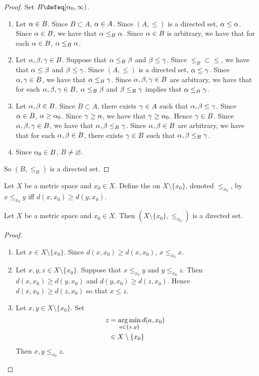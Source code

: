 \documentclass{book}
\begin{document}
	\begin{proof} Set $B \defeq [\al_0, \infty)$.
		\begin{enumerate}
			\item Let $\alpha \in B$. Since $B \subset A$, $\alpha \in A$. Since $(A, \leq)$ is a directed set, $\alpha \leq \alpha$. Since $\alpha \in B$, we have that $\alpha \leq_B \alpha$. Since $\alpha \in B$ is arbitrary, we have that for each $\alpha \in B$, $\alpha \leq_B \alpha$. 
			\item Let $\alpha, \beta, \gamma \in B$. Suppose that $\alpha \leq_B \beta$ and $\beta \leq \gamma$. Since $\leq_B \subset \leq$, we have that $\alpha \leq \beta$ and $\beta \leq \gamma$. Since $(A, \leq)$ is a directed set, $\alpha \leq \gamma$. Since $\alpha, \gamma \in B$, we have that $\alpha \leq_B \gamma$. Since $\alpha, \beta, \gamma \in B$ are arbitrary, we have that for each $\alpha, \beta, \gamma \in B$, $\alpha \leq_B \beta$ and $\beta \leq_B \gamma$ implies that $\alpha \leq_B \gamma$.
			\item Let $\alpha, \beta \in B$. Since $B \subset A$, there exists $\gamma \in A$ such that $\alpha, \beta \leq \gamma$. Since $\alpha \in B$, $\alpha \geq \alpha_0$. Since $\gamma \geq \alpha$, we have that $\gamma \geq \alpha_0$. Hence $\gamma \in B$. Since $\alpha, \beta, \gamma \in B$, we have that $\alpha, \beta \leq_B \gamma$. Since $\alpha,\beta \in B$ are arbitrary, we have that for each $\alpha, \beta \in B$, there exists $\gamma \in B$ such that $\alpha, \beta \leq_B \gamma$.  
			\item Since $\alpha_0 \in B$, $B \neq \varnothing$.
		\end{enumerate}
		So $(B, \leq_B)$ is a directed set. 
	\end{proof}

	\begin{defn} 
		Let $X$ be a metric space and $x_0 \in X$. Define the  on $X \setminus \{x_0\}$, denoted $\leq_{x_0}$, by $x \leq_{x_0} y$ iff $d(x, x_0) \geq d(y, x_0)$.
	\end{defn}

	\begin{ex} 
		 Let $X$ be a metric space and $x_0 \in X$. Then $(X \setminus \{x_0\}, \leq_{x_0})$ is a directed set. 
	\end{ex}

	\begin{proof}\
		\begin{enumerate}
			\item Let $x \in X \setminus \{x_0\}$. Since $d(x, x_0) \geq d(x, x_0)$, $x \leq_{x_0} x$.
			\item Let $x, y, z \in X \setminus \{x_0\}$. Suppose that $x \leq_{x_0} y$ and $y \leq_{x_0} z$. Then $d(x, x_0) \geq d(y, x_0)$ and $d(y, x_0) \geq d(z, x_0)$. Hence $d(x, x_0) \geq d(z, x_0)$ so that $x \leq z$.
			\item Let $x,y \in X \setminus \{x_0\}$. Set 
			\begin{align*}
				z 
				&= \operatorname*{arg\,min}\limits_{a \in \{x, y\}} d(a, x_0) \\ 
				& \in X \setminus \{x_0\} 
			\end{align*}
			Then $x, y \leq_{x_0} z$.
		\end{enumerate}
	\end{proof}
\end{document}
